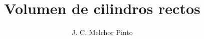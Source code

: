 \documentclass[12pt]{guia}
\title{Volumen de cilindros rectos}
\author{J. C. Melchor Pinto}
\begin{document}
\pagestyle{headandfoot}
\addpoints
\INFO
\printanswers
\begin{questions}
    
    
    \newpage
    
    
    
    \newpage
    
    
    
    \newpage
    
    
    
    \newpage
    
\end{questions}

\end{document}
